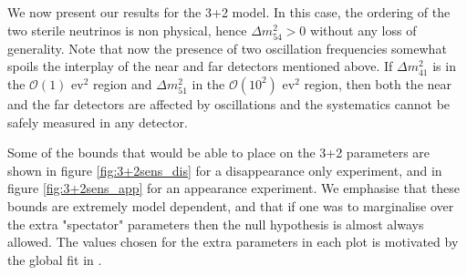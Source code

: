 	We now present our results for the 3+2 model. In this case, the ordering of the two sterile neutrinos is non physical, hence $\Delta m^2_{54} > 0 $ without any loss of generality. Note that now the presence of two oscillation frequencies somewhat spoils the interplay of the near and far detectors mentioned above. If $\Delta m^2_{41}$ is in the $\mathcal{O}(1)$ ev$^2$ region and $\Delta m^2_{51}$ in the $\mathcal{O}(10^2)$ ev$^2$ region, then both the near and the far detectors are affected by oscillations and the systematics cannot be safely measured in any detector.
	
	Some of the bounds that \nus would be able to place on the 3+2 parameters are shown in figure \ref{fig:3+2sens_dis} for a disappearance only experiment, and in figure \ref{fig:3+2sens_app} for an appearance experiment. We emphasise that these bounds are extremely model dependent, and that if one was to marginalise over the extra "spectator" parameters then the null hypothesis is almost always allowed. The values chosen for the extra parameters in each plot is motivated by the global fit in \cite{Collin2016a}.


